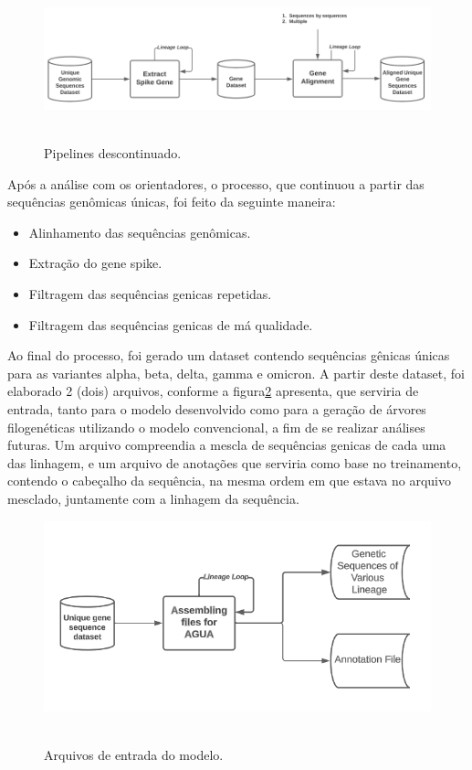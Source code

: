 \begin{figure}[htb]
  \centering
  \caption{Pipelines descontinuado.}
  \includegraphics[scale=0.45]{figuras/pipelines/pipelines_descontinuado.png}
  ~\label{fig:pipelinesDescontinuados}
\end{figure}


Após a análise com os orientadores, o processo, que continuou a partir das sequências genômicas únicas, foi feito da seguinte maneira:

\begin{itemize}
  \item Alinhamento das sequências genômicas.
  \item Extração do gene spike.
  \item Filtragem das sequências genicas repetidas.
  \item Filtragem das sequências genicas de má qualidade.
\end{itemize}

Ao final do processo, foi gerado um dataset contendo sequências gênicas únicas para as variantes alpha, beta, delta, gamma e omicron.
A partir deste dataset, foi elaborado 2 (dois) arquivos, conforme a figura\ref{fig:inputAgua} apresenta, que serviria de entrada, tanto para o modelo desenvolvido como para a geração de árvores filogenéticas utilizando o modelo convencional, a fim de se realizar análises futuras. Um arquivo compreendia a mescla de sequências genicas de cada uma das linhagem, e um arquivo de anotações que serviria como base no treinamento, contendo o cabeçalho da sequência, na mesma ordem em que estava no arquivo mesclado, juntamente com a linhagem da sequência.

\begin{figure}[htb]
  \centering
  \caption{Arquivos de entrada do modelo.}
  \includegraphics[scale=0.45]{figuras/pipelines/input_AGUA.png}
  ~\label{fig:inputAgua}
\end{figure}

